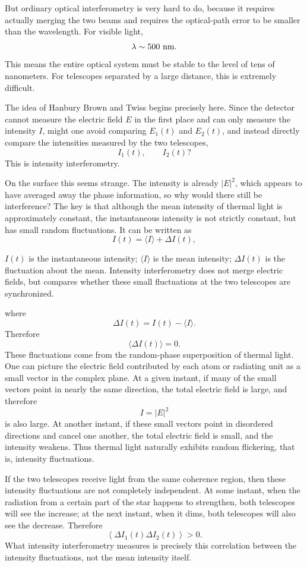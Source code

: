 But ordinary optical interferometry is very hard to do, because it requires actually merging the two beams and requires the optical-path error to be smaller than the wavelength. For visible light,
\[
  \lambda\sim 500\ {\rm nm}.
\]
This means the entire optical system must be stable to the level of tens of nanometers. For telescopes separated by a large distance, this is extremely difficult.

The idea of Hanbury Brown and Twiss begins precisely here. Since the detector cannot measure the electric field \(E\) in the first place and can only measure the intensity \(I\), might one avoid comparing \(E_1(t)\) and \(E_2(t)\), and instead directly compare the intensities measured by the two telescopes,
\[
  I_1(t),\qquad I_2(t)?
\]
This is intensity interferometry.

On the surface this seems strange. The intensity is already \(|E|^2\), which appears to have averaged away the phase information, so why would there still be interference? The key is that although the mean intensity of thermal light is approximately constant, the instantaneous intensity is not strictly constant, but has small random fluctuations. It can be written as
\[
  I(t)=\langle I\rangle+\Delta I(t),
\]
\begin{formulaexplain}
\(I(t)\) is the instantaneous intensity; \(\langle I\rangle\) is the mean intensity; \(\Delta I(t)\) is the fluctuation about the mean. Intensity interferometry does not merge electric fields, but compares whether these small fluctuations at the two telescopes are synchronized.
\end{formulaexplain}
where
\[
  \Delta I(t)=I(t)-\langle I\rangle.
\]
Therefore
\[
  \langle \Delta I(t)\rangle=0.
\]
These fluctuations come from the random-phase superposition of thermal light. One can picture the electric field contributed by each atom or radiating unit as a small vector in the complex plane. At a given instant, if many of the small vectors point in nearly the same direction, the total electric field is large, and therefore
\[
  I=|E|^2
\]
is also large. At another instant, if these small vectors point in disordered directions and cancel one another, the total electric field is small, and the intensity weakens. Thus thermal light naturally exhibits random flickering, that is, intensity fluctuations.

If the two telescopes receive light from the same coherence region, then these intensity fluctuations are not completely independent. At some instant, when the radiation from a certain part of the star happens to strengthen, both telescopes will see the increase; at the next instant, when it dims, both telescopes will also see the decrease. Therefore
\[
  \left\langle \Delta I_1(t)\Delta I_2(t)\right\rangle>0.
\]
What intensity interferometry measures is precisely this correlation between the intensity fluctuations, not the mean intensity itself.

